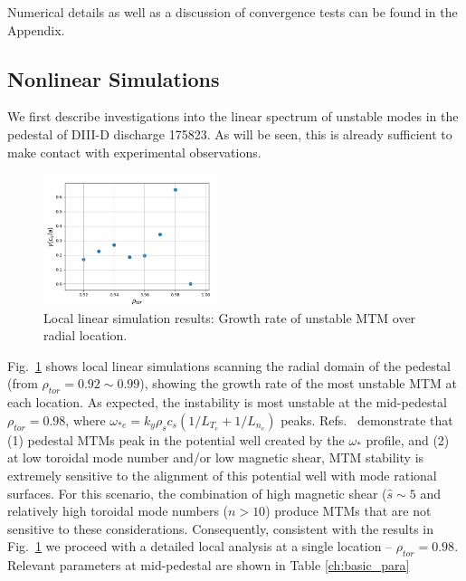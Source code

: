 \documentclass[
 aip,
 amsmath,amssymb,
 reprint
]{revtex4-1}
\begin{document}
Numerical details as well as a discussion of convergence tests can be found in the Appendix. 



\subsection{Nonlinear Simulations}
\label{nonlinear}

We first describe investigations into the linear spectrum of unstable modes in the pedestal of DIII-D discharge 175823.  As will be seen, this is already sufficient to make contact with experimental observations. 


\begin{figure}[ht]
        \includegraphics[width=0.45\textwidth]{3.png}
        \centering
        \caption[font=5]{Local linear simulation results: Growth rate of unstable MTM over radial location. }
        \label{fig:gamma}
\end{figure}


Fig.~\ref{fig:gamma} shows local linear simulations scanning the radial domain of the pedestal (from $\rho_{tor}=0.92\sim 0.99$), showing the growth rate of the most unstable MTM at each location. As expected, the instability is most unstable at the mid-pedestal $\rho_{tor}=0.98$, where $\omega_{*e} = k_y \rho_s c_s (1/L_{T_e}+1/L_{n_e})$ peaks. Refs.~\cite{Hatch_2021, Joel_prl, Ehab_MTM} demonstrate that (1) pedestal MTMs peak in the potential well created by the $\omega_*$ profile, and (2) at low toroidal mode number and/or low magnetic shear, MTM stability is extremely sensitive to the alignment of this potential well with mode rational surfaces.  For this scenario, the combination of high magnetic shear ($\hat{s} \sim 5$ and relatively high toroidal mode numbers ($n>10$) produce MTMs that are not sensitive to these considerations.  Consequently, consistent with the results in Fig.~\ref{fig:gamma} we proceed with a detailed local analysis at a single location -- $\rho_{tor}=0.98$. Relevant parameters at mid-pedestal are shown in Table \ref{ch:basic_para} 
\end{document}
